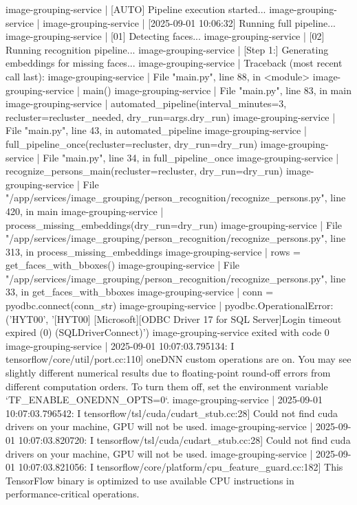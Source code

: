 image-grouping-service  | [AUTO] Pipeline execution started...
image-grouping-service  |
image-grouping-service  | [2025-09-01 10:06:32] Running full pipeline...
image-grouping-service  | [01] Detecting faces...
image-grouping-service  | [02] Running recognition pipeline...
image-grouping-service  | [Step 1:] Generating embeddings for missing faces...
image-grouping-service  | Traceback (most recent call last):
image-grouping-service  |   File "main.py", line 88, in <module>
image-grouping-service  |     main()
image-grouping-service  |   File "main.py", line 83, in main
image-grouping-service  |     automated_pipeline(interval_minutes=3, recluster=recluster_needed, dry_run=args.dry_run)
image-grouping-service  |   File "main.py", line 43, in automated_pipeline
image-grouping-service  |     full_pipeline_once(recluster=recluster, dry_run=dry_run)
image-grouping-service  |   File "main.py", line 34, in full_pipeline_once
image-grouping-service  |     recognize_persons_main(recluster=recluster, dry_run=dry_run)
image-grouping-service  |   File "/app/services/image_grouping/person_recognition/recognize_persons.py", line 420, in main
image-grouping-service  |     process_missing_embeddings(dry_run=dry_run)
image-grouping-service  |   File "/app/services/image_grouping/person_recognition/recognize_persons.py", line 313, in process_missing_embeddings
image-grouping-service  |     rows = get_faces_with_bboxes()
image-grouping-service  |   File "/app/services/image_grouping/person_recognition/recognize_persons.py", line 33, in get_faces_with_bboxes
image-grouping-service  |     conn = pyodbc.connect(conn_str)
image-grouping-service  | pyodbc.OperationalError: ('HYT00', '[HYT00] [Microsoft][ODBC Driver 17 for SQL Server]Login timeout expired (0) (SQLDriverConnect)')
image-grouping-service exited with code 0
image-grouping-service  | 2025-09-01 10:07:03.795134: I tensorflow/core/util/port.cc:110] oneDNN custom operations are on. You may see slightly different numerical results due to floating-point round-off errors from different computation orders. To turn them off, set the environment variable `TF_ENABLE_ONEDNN_OPTS=0`.
image-grouping-service  | 2025-09-01 10:07:03.796542: I tensorflow/tsl/cuda/cudart_stub.cc:28] Could not find cuda drivers on your machine, GPU will not be used.
image-grouping-service  | 2025-09-01 10:07:03.820720: I tensorflow/tsl/cuda/cudart_stub.cc:28] Could not find cuda drivers on your machine, GPU will not be used.
image-grouping-service  | 2025-09-01 10:07:03.821056: I tensorflow/core/platform/cpu_feature_guard.cc:182] This TensorFlow binary is optimized to use available CPU instructions in performance-critical operations.

